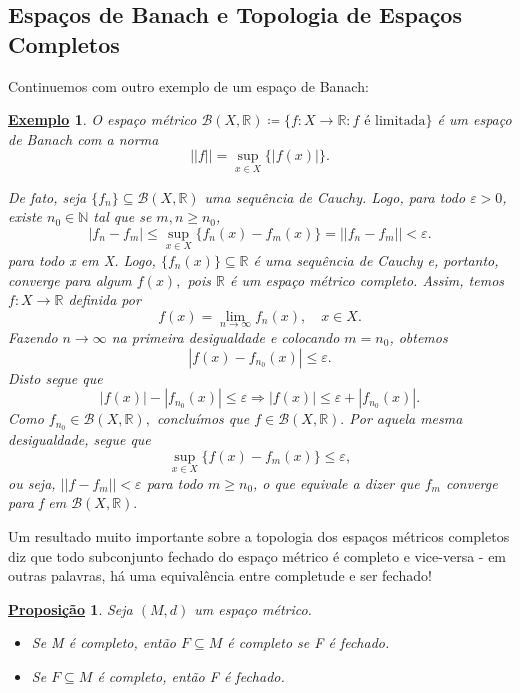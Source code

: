 \documentclass{article}
\newtheorem*{prop*}{\underline{Proposi\c c\~ao}}
\newtheorem{example}{\underline{Exemplo}}
\begin{document}
\subsection{Espaços de Banach e Topologia de Espaços Completos}
  Continuemos com outro exemplo de um espaço de Banach:
  \begin{example}
    O espaço métrico \(\mathcal{B}(X, \mathbb{R})\coloneqq \{f:X\rightarrow \mathbb{R}: f\text{ é limitada}\}\) é um espaço de Banach com a norma 
      \[
        ||f||=\sup_{x\in X}\{|f(x)|\}.
      \]

    De fato, seja \(\{f_{n}\}\subseteq{\mathcal{B}(X, \mathbb{R})}\) uma sequência de Cauchy. Logo, para todo \(\varepsilon >0\), existe \(n_{0}\in \mathbb{N}\) tal que 
  se \(m, n\geq n_{0}\), 
    \[
      |f_{n}-f_{m}|\leq \sup_{x\in X}\{f_{n}(x)-f_{m}(x)\} = ||f_{n}-f_{m}|| < \varepsilon .
    \]
  para todo x em X. Logo, \(\{f_{n}(x)\}\subseteq{\mathbb{R}}\) é uma sequência de Cauchy e, portanto, converge para algum \(f(x),\) pois \(\mathbb{R}\) é um espaço métrico completo.
Assim, temos \(f:X\rightarrow \mathbb{R}\) definida por 
  \[
    f(x) = \lim_{n\to \infty}f_{n}(x),\quad x\in X.
  \]
  Fazendo \(n\longrightarrow \infty\) na primeira desigualdade e colocando \(m=n_{0}\), obtemos 
  \[
    |f(x)-f_{n_{0}}(x)|\leq \varepsilon .
  \]
  Disto segue que 
  \[
    |f(x)| - |f_{n_{0}}(x)|\leq \varepsilon \Rightarrow |f(x)|\leq \varepsilon + |f_{n_{0}}(x)|.
  \]
  Como \(f_{n_{0}}\in \mathcal{B}(X, \mathbb{R}),\) concluímos que \(f\in \mathcal{B}(X, \mathbb{R}).\) Por aquela mesma desigualdade, segue que 
  \[
    \sup_{x\in X}\{f(x)-f_{m}(x)\}\leq \varepsilon ,
  \]
  ou seja, \(||f-f_{m}|| < \varepsilon \) para todo \(m\geq n_{0}\), o que equivale a dizer que \(f_{m}\) converge para f em \(\mathcal{B}(X, \mathbb{R}).\)
  \end{example}
  Um resultado muito importante sobre a topologia dos espaços métricos completos diz que todo subconjunto fechado do espaço métrico é completo e vice-versa - em outras
palavras, há uma equivalência entre completude e ser fechado! 
 \begin{prop*}
   Seja \((M, d)\) um espaço métrico.
 \begin{itemize}
   \item[a)] Se M é completo, então \(F\subseteq{M}\) é completo se F é fechado.
   \item[b)] Se \(F\subseteq{M}\) é completo, então F é fechado.
 \end{itemize}
\end{prop*}
\end{document}
